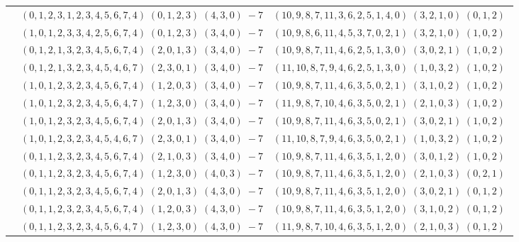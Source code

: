 \documentclass[11pt]{article}
\begin{document}
\begin{longtable}[l]{|c|c|c|}
 \cline{2-3} 
 & $(0 ,1 ,2 ,3 ,1 ,2 ,3 ,4 ,5 ,6 ,7 ,4) \;(0 ,1 ,2 ,3) \;(4 ,3 ,0) \;-7$ & $(10 ,9 ,8 ,7 ,11 ,3 ,6 ,2 ,5 ,1 ,4 ,0) \;(3 ,2 ,1 ,0) \;(0 ,1 ,2) \;$\\ 
 \cline{2-3} 
 & $(1 ,0 ,1 ,2 ,3 ,3 ,4 ,2 ,5 ,6 ,7 ,4) \;(0 ,1 ,2 ,3) \;(3 ,4 ,0) \;-7$ & $(10 ,9 ,8 ,6 ,11 ,4 ,5 ,3 ,7 ,0 ,2 ,1) \;(3 ,2 ,1 ,0) \;(1 ,0 ,2) \;$\\ 
 \cline{2-3} 
 & $(0 ,1 ,2 ,1 ,3 ,2 ,3 ,4 ,5 ,6 ,7 ,4) \;(2 ,0 ,1 ,3) \;(3 ,4 ,0) \;-7$ & $(10 ,9 ,8 ,7 ,11 ,4 ,6 ,2 ,5 ,1 ,3 ,0) \;(3 ,0 ,2 ,1) \;(1 ,0 ,2) \;$\\ 
 \cline{2-3} 
 & $(0 ,1 ,2 ,1 ,3 ,2 ,3 ,4 ,5 ,4 ,6 ,7) \;(2 ,3 ,0 ,1) \;(3 ,4 ,0) \;-7$ & $(11 ,10 ,8 ,7 ,9 ,4 ,6 ,2 ,5 ,1 ,3 ,0) \;(1 ,0 ,3 ,2) \;(1 ,0 ,2) \;$\\ 
 \cline{2-3} 
 & $(1 ,0 ,1 ,2 ,3 ,2 ,3 ,4 ,5 ,6 ,7 ,4) \;(1 ,2 ,0 ,3) \;(3 ,4 ,0) \;-7$ & $(10 ,9 ,8 ,7 ,11 ,4 ,6 ,3 ,5 ,0 ,2 ,1) \;(3 ,1 ,0 ,2) \;(1 ,0 ,2) \;$\\ 
 \cline{2-3} 
 & $(1 ,0 ,1 ,2 ,3 ,2 ,3 ,4 ,5 ,6 ,4 ,7) \;(1 ,2 ,3 ,0) \;(3 ,4 ,0) \;-7$ & $(11 ,9 ,8 ,7 ,10 ,4 ,6 ,3 ,5 ,0 ,2 ,1) \;(2 ,1 ,0 ,3) \;(1 ,0 ,2) \;$\\ 
 \cline{2-3} 
 & $(1 ,0 ,1 ,2 ,3 ,2 ,3 ,4 ,5 ,6 ,7 ,4) \;(2 ,0 ,1 ,3) \;(3 ,4 ,0) \;-7$ & $(10 ,9 ,8 ,7 ,11 ,4 ,6 ,3 ,5 ,0 ,2 ,1) \;(3 ,0 ,2 ,1) \;(1 ,0 ,2) \;$\\ 
 \cline{2-3} 
 & $(1 ,0 ,1 ,2 ,3 ,2 ,3 ,4 ,5 ,4 ,6 ,7) \;(2 ,3 ,0 ,1) \;(3 ,4 ,0) \;-7$ & $(11 ,10 ,8 ,7 ,9 ,4 ,6 ,3 ,5 ,0 ,2 ,1) \;(1 ,0 ,3 ,2) \;(1 ,0 ,2) \;$\\ 
 \cline{2-3} 
 & $(0 ,1 ,1 ,2 ,3 ,2 ,3 ,4 ,5 ,6 ,7 ,4) \;(2 ,1 ,0 ,3) \;(3 ,4 ,0) \;-7$ & $(10 ,9 ,8 ,7 ,11 ,4 ,6 ,3 ,5 ,1 ,2 ,0) \;(3 ,0 ,1 ,2) \;(1 ,0 ,2) \;$\\ 
 \cline{2-3} 
 & $(0 ,1 ,1 ,2 ,3 ,2 ,3 ,4 ,5 ,6 ,7 ,4) \;(1 ,2 ,3 ,0) \;(4 ,0 ,3) \;-7$ & $(10 ,9 ,8 ,7 ,11 ,4 ,6 ,3 ,5 ,1 ,2 ,0) \;(2 ,1 ,0 ,3) \;(0 ,2 ,1) \;$\\ 
 \cline{2-3} 
 & $(0 ,1 ,1 ,2 ,3 ,2 ,3 ,4 ,5 ,6 ,7 ,4) \;(2 ,0 ,1 ,3) \;(4 ,3 ,0) \;-7$ & $(10 ,9 ,8 ,7 ,11 ,4 ,6 ,3 ,5 ,1 ,2 ,0) \;(3 ,0 ,2 ,1) \;(0 ,1 ,2) \;$\\ 
 \cline{2-3} 
 & $(0 ,1 ,1 ,2 ,3 ,2 ,3 ,4 ,5 ,6 ,7 ,4) \;(1 ,2 ,0 ,3) \;(4 ,3 ,0) \;-7$ & $(10 ,9 ,8 ,7 ,11 ,4 ,6 ,3 ,5 ,1 ,2 ,0) \;(3 ,1 ,0 ,2) \;(0 ,1 ,2) \;$\\ 
 \cline{2-3} 
 & $(0 ,1 ,1 ,2 ,3 ,2 ,3 ,4 ,5 ,6 ,4 ,7) \;(1 ,2 ,3 ,0) \;(4 ,3 ,0) \;-7$ & $(11 ,9 ,8 ,7 ,10 ,4 ,6 ,3 ,5 ,1 ,2 ,0) \;(2 ,1 ,0 ,3) \;(0 ,1 ,2) \;$\\ 

\end{longtable}
\end{document}
